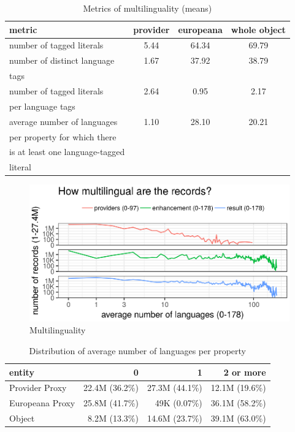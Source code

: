 \begin{table}
\caption{Metrics of multilinguality (means)}
\label{table:multilinguality_metrics}
\centering
\begin{tabular}{l|c|c|c}
metric & provider & europeana & whole object \\
\hline
number of tagged literals & 5.44 & 64.34 & 69.79 \\
\hline
number of distinct language & 1.67 & 37.92 & 38.79 \\
tags & & & \\
\hline
number of tagged literals & 2.64 & 0.95 & 2.17 \\
per language tags & & & \\
\hline
average number of languages & 1.10 & 28.10 & 20.21 \\
per property for which there & & & \\
is at least one language-tagged & & & \\
 literal & & & \\
\end{tabular}
\end{table}

\begin{figure}[ht]
\includegraphics[width=\textwidth]{images/chapter02/multilinguality-summary.eps}
\centering
\caption{Multilinguality}
\label{figure:multilinguality}
\end{figure}

\begin{table}
\caption{Distribution of average number of languages per property}
\label{table:multilinguality_distribution}
\centering
\begin{tabular}{l|r|r|r}
entity & 0 & 1 & 2 or more \\
\hline
Provider Proxy & 22.4M (36.2\%) & 27.3M (44.1\%) & 12.1M (19.6\%) \\
Europeana Proxy & 25.8M (41.7\%) & 49K (0.07\%) & 36.1M (58.2\%) \\
Object & 8.2M (13.3\%) & 14.6M (23.7\%) & 39.1M (63.0\%) \\   
\end{tabular}
\end{table}

